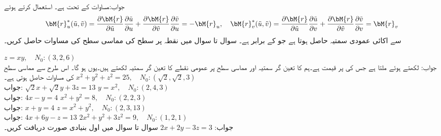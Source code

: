 جواب:\quad مساوات  کے تحت  ہے۔   استعمال کرتے ہوئے 
\begin{align*}
\bM{r}_u^*(\tilde{u},\tilde{v})=\frac{\partial \bM{r}}{\partial \tilde{u}}\frac{\partial \tilde{u}}{\partial u}+\frac{\partial \bM{r}}{\partial \tilde{v}}\frac{\partial \tilde{v}}{\partial u}=-\bM{r}_u,\quad
\bM{r}_v^*(\tilde{u},\tilde{v})=\frac{\partial \bM{r}}{\partial \tilde{u}}\frac{\partial \tilde{u}}{\partial v}+\frac{\partial \bM{r}}{\partial \tilde{v}}\frac{\partial \tilde{v}}{\partial v}=\bM{r}_v
\end{align*}
سے اکائی عمودی سمتیہ  حاصل ہوتا ہے جو   کے برابر ہے۔
سوال  تا سوال  میں نقطہ  پر سطح  کی مماسی سطح کی مساوات حاصل کریں۔

\quad
$z=xy,\quad N_0:(3,2,6)$\\
جواب:\quad {} لکھتے ہوئے  ملتا ہے جس کی  پر قیمت 
 ہے۔ہم  کا تعین گر سمتیہ  اور مماسی سطح پر عمومی نقطے کا تعین گر سمتیہ   لکھتے ہیں۔یوں  ہو گا۔ اس طرح  سے  مماسی سطح کی مساوات   حاصل ہوتی ہے۔
\quad
$x^2+y^2+z^2=25,\quad N_0:(\sqrt{2},\sqrt{2},3)$\\
جواب:\quad 
$\sqrt{2}x+\sqrt{2}y+3z=13$
\quad
$y=x^2,\quad N_0:(2,4,3)$\\
جواب:\quad 
$4x-y=4$
\quad
$x^2+y^2=8,\quad N_0:(2,2,3)$\\
جواب:\quad 
$x+y=4$
\quad
$z=x^2+y^2,\quad N_0:(2,3,13)$\\
جواب:\quad 
$4x+6y-z=13$
\quad
$2x^2+y^2+3z^2=9,\quad N_0:(1,2,1)$\\
جواب:\quad 
$2x+2y-3z=3$
سوال  تا سوال  میں اول بنیادی صورت دریافت کریں۔


